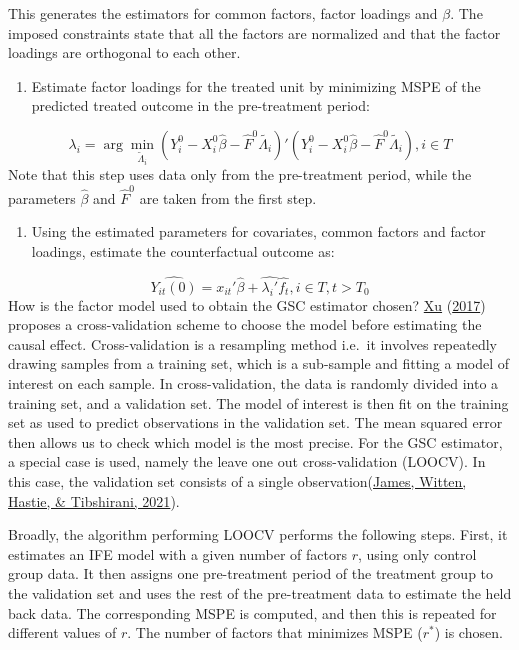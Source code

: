 \documentclass[12pt,nobind, a4paper]{reedthesis}
\providecommand{\tightlist}{%
	\setlength{\itemsep}{0pt}\setlength{\parskip}{0pt}}
\begin{document}
 This generates the estimators for common factors, factor loadings and \(\beta\). The imposed constraints state that all the factors are normalized and that the factor loadings are orthogonal to each other.
 \begin{enumerate}
 \def\labelenumi{\arabic{enumi}.}
 \setcounter{enumi}{1}
 \tightlist
 \item
   Estimate factor loadings for the treated unit by minimizing MSPE of the predicted treated outcome in the pre-treatment period:
 \end{enumerate}
 \[\lambda_{i}=\arg\min_{\tilde{\Lambda}_{i}} (Y_{i}^{0}-X_{i}^{0} \hat{\beta}-\hat{F}^{0}\tilde{\Lambda_{i}})'(Y_{i}^{0}-X_{i}^{0} \hat{\beta}-\hat{F}^{0}\tilde{\Lambda_{i}}), i \in T\]
 Note that this step uses data only from the pre-treatment period, while the parameters \(\hat{\beta}\) and \(\hat{F}^{0}\) are taken from the first step.
 \begin{enumerate}
 \def\labelenumi{\arabic{enumi}.}
 \setcounter{enumi}{2}
 \tightlist
 \item
   Using the estimated parameters for covariates, common factors and factor loadings, estimate the counterfactual outcome as:
 \end{enumerate}
 \[\hat{Y_{it}(0)}=x_{it}'\hat{\beta}+\hat{\lambda_{i}'}\hat{f_{t}},  i\in T, t>T_{0}\]
 How is the factor model used to obtain the GSC estimator chosen? \protect\hyperlink{ref-xu_generalized_2017}{Xu} (\protect\hyperlink{ref-xu_generalized_2017}{2017}) proposes a cross-validation scheme to choose the model before estimating the causal effect. Cross-validation is a resampling method i.e.~it involves repeatedly drawing samples from a training set, which is a sub-sample and fitting a model of interest on each sample. In cross-validation, the data is randomly divided into a training set, and a validation set. The model of interest is then fit on the training set as used to predict observations in the validation set. The mean squared error then allows us to check which model is the most precise. For the GSC estimator, a special case is used, namely the leave one out cross-validation (LOOCV). In this case, the validation set consists of a single observation(\protect\hyperlink{ref-james_introduction_2021}{James, Witten, Hastie, \& Tibshirani, 2021}).
 \linebreak

 Broadly, the algorithm performing LOOCV performs the following steps. First, it estimates an IFE model with a given number of factors \(r\), using only control group data. It then assigns one pre-treatment period of the treatment group to the validation set and uses the rest of the pre-treatment data to estimate the held back data. The corresponding MSPE is computed, and then this is repeated for different values of \(r\). The number of factors that minimizes MSPE (\(r^{*}\)) is chosen.
 \linebreak
\end{document}
